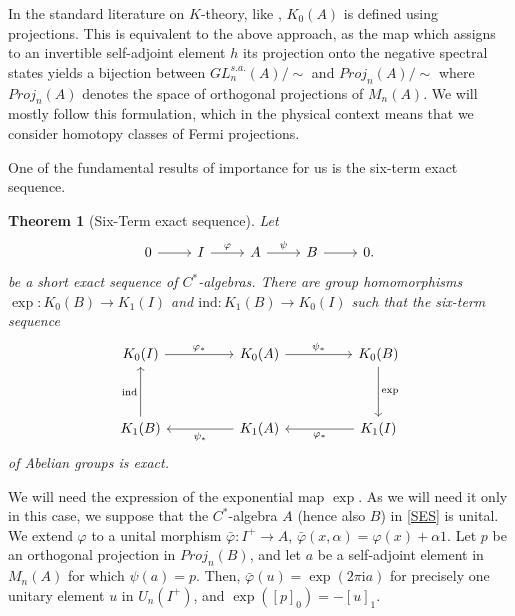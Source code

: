 \documentclass[11pt]{amsart}
\newtheorem{theorem}{Theorem}[section]\newcommand{\bigzero}{\mbox{\normalfont\Large\bfseries 0}}
\begin{document}
In the standard literature on $K$-theory, like \cite{rordam2000introduction}, $K_0(A)$ is defined using projections. This is equivalent to the above approach, as the map which assigns to an invertible self-adjoint element
$h$ its projection onto the negative spectral states yields a bijection between $GL_n^{s.a.}(A)/\sim$ and $Proj_n(A)/\sim$ where $Proj_n(A)$ denotes the space of orthogonal projections of $M_n(A)$. We will mostly follow this formulation, which in the physical context means that we consider homotopy classes of Fermi projections.

One of the fundamental results of importance for us is the six-term exact sequence.
\begin{theorem}[Six-Term exact sequence]
Let
\begin{equation}\label{SES}
    \begin{tikzcd}
	0 & I & A & B & 0.
	\arrow[from=1-1, to=1-2]
	\arrow["\varphi", from=1-2, to=1-3]
	\arrow["\psi", from=1-3, to=1-4]
	\arrow[from=1-4, to=1-5]
\end{tikzcd}
\end{equation}
be a short exact sequence of $C^*$-algebras.
    There are group homomorphisms $\exp : K_0 (B) \rightarrow K_1 (I)$ and $\mathrm{ind} : K_1 (B) \rightarrow K_0 (I)$ such that the six-term sequence
    $$\begin{tikzcd}
	{K_0(I)} && {K_0(A)} && {K_0(B)} \\
	\\
	{K_1(B)} && {K_1(A)} && {K_1(I)}
	\arrow["{\varphi_*}", from=1-1, to=1-3]
	\arrow["{\psi_*}", from=1-3, to=1-5]
	\arrow["{\exp}", from=1-5, to=3-5]
	\arrow["{\psi_*}", from=3-3, to=3-1]
	\arrow["{\varphi_*}", from=3-5, to=3-3]
    \arrow["{\mathrm{ind}}", from=3-1, to=1-1]
\end{tikzcd}$$
    of Abelian groups is exact.
\end{theorem}
We will need the expression of the exponential map $\exp$. As we will need it only in this case, we suppose that the $C^*$-algebra $A$ (hence also $B$) in \eqref{SES} is unital. We extend $\varphi$ to a unital morphism $\bar{\varphi}:I^+\rightarrow A$, $\bar{\varphi}(x,\alpha)=\varphi(x)+\alpha 1$. 
Let $p$ be an orthogonal  projection in $Proj_n(B)$, and let $a$ be a self-adjoint element in $M_n(A)$ for which $\psi(a)=p$. Then, $\bar{\varphi}(u)=\exp(2\pi\text{i}a)$ for precisely one unitary element $u$ in $U_n(I^+)$, and $\exp([p]_0)=-[u]_1$.
\end{document}
